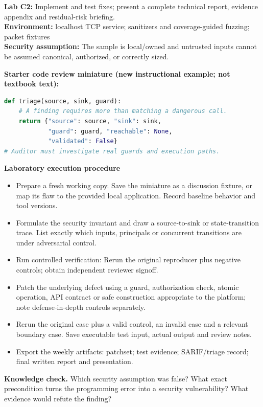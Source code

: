 \documentclass[10pt,letterpaper]{article}
\begin{document}
\begin{insight}\textbf{Lab C2:} Implement and test fixes; present a complete technical report, evidence appendix and residual-risk briefing.\\\textbf{Environment:} localhost TCP service; sanitizers and coverage-guided fuzzing; packet fixtures\\\textbf{Security assumption:} The sample is local/owned and untrusted inputs cannot be assumed canonical, authorized, or correctly sized.\end{insight}
\textbf{Starter code review miniature (new instructional example; not textbook text):}
\begin{lstlisting}[language=Python]
def triage(source, sink, guard):
    # A finding requires more than matching a dangerous call.
    return {"source": source, "sink": sink,
            "guard": guard, "reachable": None,
            "validated": False}
# Auditor must investigate real guards and execution paths.
\end{lstlisting}
\textbf{Laboratory execution procedure}
\begin{itemize}[leftmargin=*,itemsep=2pt]
\item Prepare a fresh working copy. Save the miniature as a discussion fixture, or map its flaw to the provided local application. Record baseline behavior and tool versions.
\item Formulate the security invariant and draw a source-to-sink or state-transition trace. List exactly which inputs, principals or concurrent transitions are under adversarial control.
\item Run controlled verification: Rerun the original reproducer plus negative controls; obtain independent reviewer signoff.
\item Patch the underlying defect using a guard, authorization check, atomic operation, API contract or safe construction appropriate to the platform; note defense-in-depth controls separately.
\item Rerun the original case plus a valid control, an invalid case and a relevant boundary case. Save executable test input, actual output and review notes.
\item Export the weekly artifacts: patchset; test evidence; SARIF/triage record; final written report and presentation.
\end{itemize}
\textbf{Knowledge check.} Which security assumption was false? What exact precondition turns the programming error into a security vulnerability? What evidence would refute the finding?
\end{document}
